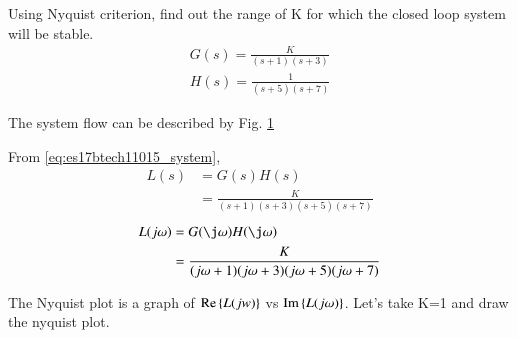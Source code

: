 
\item Using Nyquist criterion, find out the range of K for which the closed loop system will be stable.\newline
\begin{align}
\label{eq:es17btech11015_system}
    \nonumber G(s)=\frac{K}{(s+1)(s+3)}
    \\
    H(s)=\frac{1}{(s+5)(s+7)}
\end{align}

The system flow can be described by Fig. \ref{fig:es17btech11015_fig1}
\begin{figure}[!ht]
    \begin{center}
        \resizebox{\columnwidth}{!}{}
    \end{center}
    \caption{}  
    \label{fig:es17btech11015_fig1}
\end{figure}
From \eqref{eq:es17btech11015_system},
%
 \begin{align}
 \label{eq:es17btech11015_openloop}
L(s)&=G(s)H(s)\nonumber\\
&=\frac{K}{(s+1)(s+3)(s+5)(s+7)}
 \end{align}
 \begin{align}
L(j\omega)&=G(\j \omega)H(\j \omega)\nonumber\\
&=\frac{K}{(j\omega+1)(j\omega+3)(j\omega+5)(j\omega+7)}
\end{align}

The Nyquist plot is a graph of $\text{Re} \left\{L(jw)\right\}$  vs $\text{Im} \left\{L(j\omega)\right\}$.
Let's take K=1 and draw the nyquist plot.
\\


